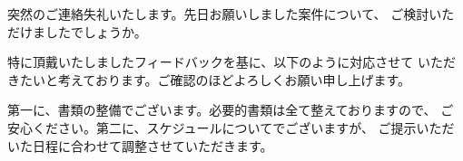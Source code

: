 \documentclass[14pt]{jlreq}
\begin{document}
\makeLetterHeader

\makeRecipientBlock

\begin{letter}

\makeOpening

\makeTransition

\par 突然のご連絡失礼いたします。先日お願いしました案件について、
 ご検討いただけましたでしょうか。

\par 特に頂戴いたしましたフィードバックを基に、以下のように対応させて
 いただきたいと考えております。ご確認のほどよろしくお願い申し上げます。

\par 第一に、書類の整備でございます。必要的書類は全て整えておりますので、
 ご安心ください。第二に、スケジュールについてでございますが、
 ご提示いただいた日程に合わせて調整させていただきます。

\makeClosingGreeting

\makeClosing

\makeSignature

\end{letter}

\end{document}
